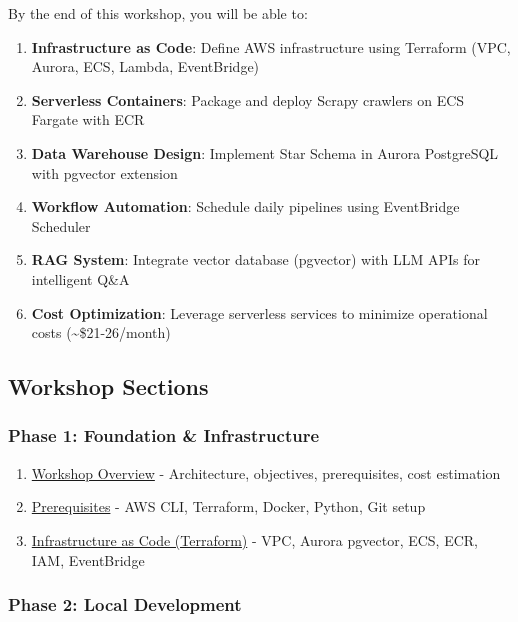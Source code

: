 By the end of this workshop, you will be able to:

\begin{enumerate}
\def\labelenumi{\arabic{enumi}.}
\tightlist
\item
  \textbf{Infrastructure as Code}: Define AWS infrastructure using
  Terraform (VPC, Aurora, ECS, Lambda, EventBridge)
\item
  \textbf{Serverless Containers}: Package and deploy Scrapy crawlers on
  ECS Fargate with ECR
\item
  \textbf{Data Warehouse Design}: Implement Star Schema in Aurora
  PostgreSQL with pgvector extension
\item
  \textbf{Workflow Automation}: Schedule daily pipelines using
  EventBridge Scheduler
\item
  \textbf{RAG System}: Integrate vector database (pgvector) with LLM
  APIs for intelligent Q\&A
\item
  \textbf{Cost Optimization}: Leverage serverless services to minimize
  operational costs (\textasciitilde\$21-26/month)
\end{enumerate}

\hypertarget{workshop-sections}{%
\subsection{Workshop Sections}}

\hypertarget{phase-1-foundation-infrastructure}{%
\subsubsection{Phase 1: Foundation \&
Infrastructure}}

\begin{enumerate}
\def\labelenumi{\arabic{enumi}.}
\tightlist
\item
  \href{5.1-Workshop-overview/}{Workshop Overview} - Architecture,
  objectives, prerequisites, cost estimation
\item
  \href{5.2-Prerequisites/}{Prerequisites} - AWS CLI, Terraform, Docker,
  Python, Git setup
\item
  \href{5.3-Infrastructure/}{Infrastructure as Code (Terraform)} - VPC,
  Aurora pgvector, ECS, ECR, IAM, EventBridge
\end{enumerate}

\hypertarget{phase-2-local-development}{%
\subsubsection{Phase 2: Local
Development}}


